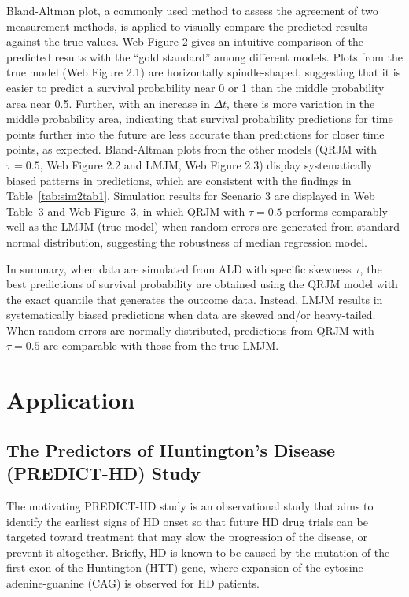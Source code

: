 \documentclass[Crown, sagev, times, doublespace]{sagej}
\begin{document}
Bland-Altman plot,\citep{bland1986statistical} a commonly used method to assess the agreement of two measurement methods, is applied to visually compare the predicted results against the true values. Web Figure 2 gives an intuitive comparison of the predicted results with the ``gold standard'' among different models. Plots from the true model (Web Figure 2.1) are horizontally spindle-shaped, suggesting that it is easier to predict a survival probability near 0 or 1 than the middle probability area near 0.5. Further, with an increase in $\Delta t$, there is more variation in the middle probability area, indicating that survival probability predictions for time points further into the future are less accurate than predictions for closer time points, as expected. Bland-Altman plots from the other models (QRJM with $\tau=0.5$, Web Figure 2.2 and LMJM, Web Figure 2.3) display systematically biased patterns in predictions, which are consistent with the findings in Table~\ref{tab:sim2tab1}. Simulation results for Scenario 3 are displayed in Web Table~3 and Web Figure~3, in which QRJM with $\tau = 0.5$ performs comparably well as the LMJM (true model) when random errors are generated from standard normal distribution, suggesting the robustness of median regression model.

In summary, when data are simulated from ALD with specific skewness $\tau$, the best predictions of survival probability are obtained using the QRJM model with the exact quantile that generates the outcome data. Instead, LMJM results in systematically biased predictions when data are skewed and/or heavy-tailed. When random errors are normally distributed, predictions from QRJM with $\tau=0.5$ are comparable with those from the true LMJM.

\section{Application}\label{sec:data}

\subsection{The Predictors of Huntington's Disease (PREDICT-HD) Study}\label{sec:data_analysis}
The motivating PREDICT-HD study is an observational study that aims to identify the earliest signs of HD onset so that future HD drug trials can be targeted toward treatment that may slow the progression of the disease, or prevent it altogether.\citep{paulsen2008detection} Briefly, HD is known to be caused by the mutation of the first exon of the Huntington (HTT) gene, where expansion of the cytosine-adenine-guanine (CAG) is observed for HD patients.\par
\end{document}
